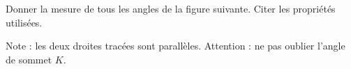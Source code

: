 
\begin{exercice}\label{exo2smath-0160}

    Donner la mesure de tous les angles de la figure suivante. Citer les propriétés utilisées.
\begin{center}

\end{center}
Note : les deux droites tracées sont parallèles. Attention : ne pas oublier l'angle de sommet \( K\).

\end{exercice}
